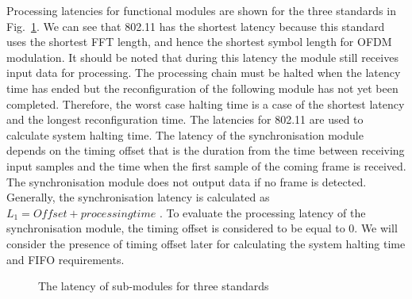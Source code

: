 Processing latencies for functional modules are shown for the three standards in Fig.~\ref{fig:Latency}. We can see that 802.11 has the shortest latency because this standard uses the shortest FFT length, and hence the shortest symbol length for OFDM modulation.
It should be noted that during this latency the module still receives input data for processing.
The processing chain must be halted when the latency time has ended but the reconfiguration of the following module has not yet been completed. Therefore, the worst case halting time is a case of the shortest latency and the longest reconfiguration time.
The latencies for 802.11 are used to calculate system halting time.
The latency of the synchronisation module depends on the timing offset that is the duration from the time between receiving input samples and the time when the first sample of the coming frame is received. The synchronisation module does not output data if no frame is detected. Generally, the synchronisation latency is calculated as $L_{1} = \mathit{Offset} + \mathit{processing time}$ .
To evaluate the processing latency of the synchronisation module, the timing offset is considered to be equal to 0. We will consider the presence of timing offset later for calculating the system halting time and FIFO requirements.
\begin{figure}
\centering
{}
\caption{The latency of sub-modules for three standards}
\label{fig:Latency}
\end{figure}


